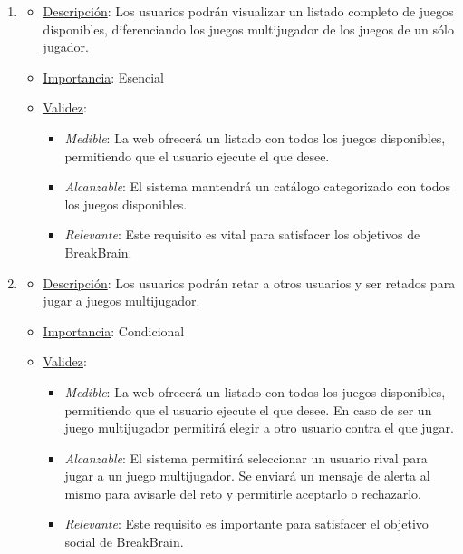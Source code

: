 \begin{enumerate}
\item %
  \begin{itemize}
  \item \underline{Descripción}: Los usuarios podrán visualizar un listado completo de juegos disponibles, diferenciando los juegos multijugador de los juegos de un sólo jugador.
  \item \underline{Importancia}: Esencial
  \item \underline{Validez}:
    \begin{itemize}
    \item \textit{Medible}: La web ofrecerá un listado con todos los juegos disponibles, permitiendo que el usuario ejecute el que desee.
    \item \textit{Alcanzable}: El sistema mantendrá un catálogo categorizado con todos los juegos disponibles.
    \item \textit{Relevante}: Este requisito es vital para satisfacer los objetivos de BreakBrain.
    \end{itemize}
  \end{itemize}

\item %
  \begin{itemize}
  \item \underline{Descripción}: Los usuarios podrán retar a otros usuarios y ser retados para jugar a juegos multijugador.
  \item \underline{Importancia}: Condicional
  \item \underline{Validez}:
    \begin{itemize}
    \item \textit{Medible}: La web ofrecerá un listado con todos los juegos disponibles, permitiendo que el usuario ejecute el que desee. En caso de ser un juego multijugador permitirá elegir a otro usuario contra el que jugar.
    \item \textit{Alcanzable}: El sistema permitirá seleccionar un usuario rival para jugar a un juego multijugador. Se enviará un mensaje de alerta al mismo para avisarle del reto y permitirle aceptarlo o rechazarlo.
    \item \textit{Relevante}: Este requisito es importante para satisfacer el objetivo social de BreakBrain.
    \end{itemize}
  \end{itemize}


\end{enumerate}

